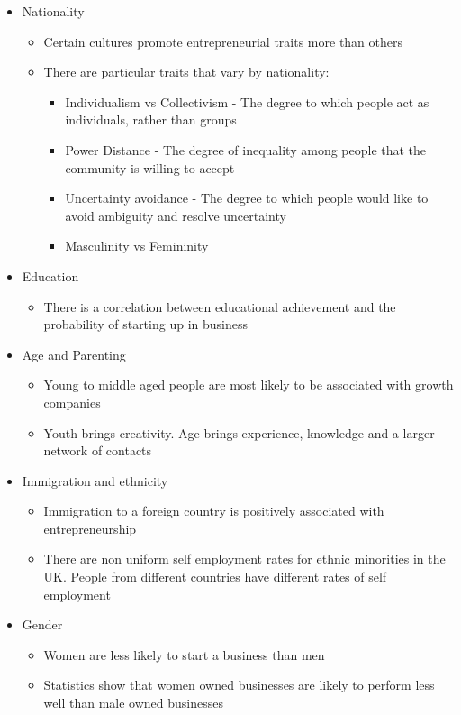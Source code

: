 \documentclass{article}[18pt]
\begin{document}
\begin{itemize}
\item Nationality
\begin{itemize}
\item Certain cultures promote entrepreneurial traits more than others
\item There are particular traits that vary by nationality:
\begin{itemize}
\item Individualism vs Collectivism - The degree to which people act as individuals, rather than groups
\item Power Distance - The degree of inequality among people that the community is willing to accept
\item Uncertainty avoidance - The degree to which people would like to avoid ambiguity and resolve uncertainty
\item Masculinity vs Femininity
\end{itemize}
\end{itemize}

\item Education
\begin{itemize}
\item There is a correlation between educational achievement and the probability of starting up in business
\end{itemize}

\item Age and Parenting
\begin{itemize}
\item Young to middle aged people are most likely to be associated with growth companies
\item Youth brings creativity. Age brings experience, knowledge and a larger network of contacts 
\end{itemize}

\item Immigration and ethnicity
\begin{itemize}
\item Immigration to a foreign country is positively associated with entrepreneurship
\item There are non uniform self employment rates for ethnic minorities in the UK. People from different countries have different rates of self employment
\end{itemize}

\item Gender
\begin{itemize}
\item Women are less likely to start a business than men
\item Statistics show that women owned businesses are likely to perform less well than male owned businesses
\end{itemize}
\end{itemize}
\end{document}
